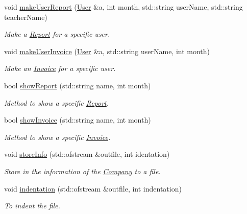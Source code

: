 \begin{DoxyCompactItemize}
\begin{DoxyCompactList}
\begin{DoxyItemize}
\end{DoxyItemize}\end{DoxyCompactList}\item 
void \mbox{\hyperlink{class_company_a8cda4441776f3abe755cb78b32fc0f46}{make\+User\+Report}} (\mbox{\hyperlink{class_user}{User}} \&a, int month, std\+::string user\+Name, std\+::string teacher\+Name)
\begin{DoxyCompactList}\small\item\em Make a \mbox{\hyperlink{class_report}{Report}} for a specific user. \end{DoxyCompactList}\item 
void \mbox{\hyperlink{class_company_a25feed1c9ea0ec0c33ab593f1b43ac18}{make\+User\+Invoice}} (\mbox{\hyperlink{class_user}{User}} \&a, std\+::string user\+Name, int month)
\begin{DoxyCompactList}\small\item\em Make an \mbox{\hyperlink{class_invoice}{Invoice}} for a specific user. \end{DoxyCompactList}\item 
bool \mbox{\hyperlink{class_company_a2c00c88b245aef0e0e52864b585f8f6b}{show\+Report}} (std\+::string name, int month)
\begin{DoxyCompactList}\small\item\em Method to show a specific \mbox{\hyperlink{class_report}{Report}}. \end{DoxyCompactList}\item 
bool \mbox{\hyperlink{class_company_ad3d0ab0209f13ca48a83df34564ef055}{show\+Invoice}} (std\+::string name, int month)
\begin{DoxyCompactList}\small\item\em Method to show a specific \mbox{\hyperlink{class_invoice}{Invoice}}. \end{DoxyCompactList}\item 
void \mbox{\hyperlink{class_company_ac03f62f1accf21eb445a7aa5731b1199}{store\+Info}} (std\+::ofstream \&outfile, int identation)
\begin{DoxyCompactList}\small\item\em Store in the information of the \mbox{\hyperlink{class_company}{Company}} to a file. \end{DoxyCompactList}\item 
void \mbox{\hyperlink{class_company_aa8b5bbb3b2d49d13f36d4fcdfc0d20d1}{indentation}} (std\+::ofstream \&outfile, int indentation)
\begin{DoxyCompactList}\small\item\em To indent the file. \end{DoxyCompactList}\item 

\end{DoxyCompactItemize}
